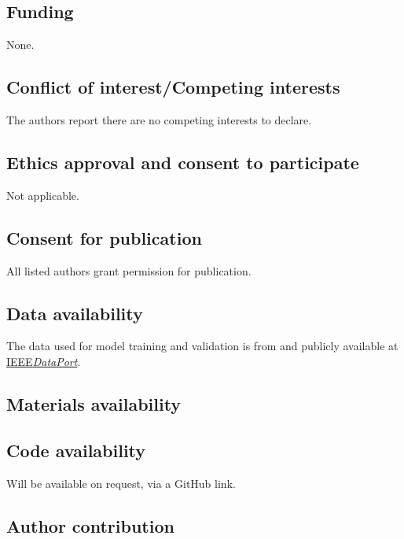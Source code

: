 \documentclass[referee, sn-mathphys-num]{sn-jnl}
\begin{document}
	\subsection*{Funding}
	None.
	\subsection*{Conflict of interest/Competing interests}
	The authors report there are no competing interests to declare.
	
	\subsection*{Ethics approval and consent to participate}
	Not applicable.
	
	\subsection*{Consent for publication}
	All listed authors grant permission for publication.
	
	\subsection*{Data availability}
	The data used for model training and validation is from \cite{PHM-dataset} and publicly available at \href{https://doi.org/10.21227/jdxd-yy51}{IEEE\textit{DataPort}}. 
	
	\subsection*{Materials availability}
	\subsection*{Code availability}
	Will be available on request, via a GitHub link.
	\subsection*{Author contribution}
	
\end{document}
